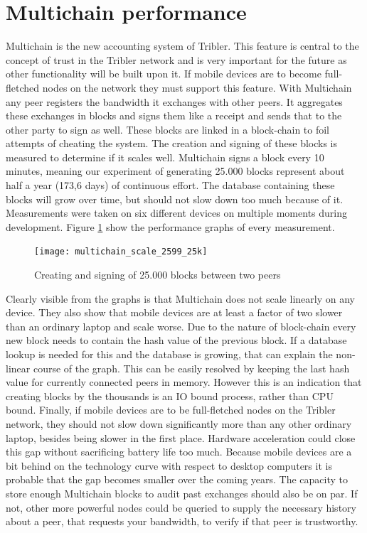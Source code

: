 \section{Multichain performance}
Multichain is the new accounting system of Tribler.
This feature is central to the concept of trust in the Tribler network and is very important for the future as other functionality will be built upon it.
If mobile devices are to become full-fletched nodes on the network they must support this feature.
With Multichain any peer registers the bandwidth it exchanges with other peers.
It aggregates these exchanges in blocks and signs them like a receipt and sends that to the other party to sign as well.
These blocks are linked in a block-chain to foil attempts of cheating the system.
The creation and signing of these blocks is measured to determine if it scales well.
Multichain signs a block every 10 minutes, meaning our experiment of generating 25.000 blocks represent about half a year (173,6 days) of continuous effort.
The database containing these blocks will grow over time, but should not slow down too much because of it.
Measurements were taken on six different devices on multiple moments during development.
Figure \ref{fig:multichain_25} show the performance graphs of every measurement.
\begin{figure}
	\centering
	\texttt{[image: multichain\_scale\_2599\_25k]}
	\caption{Creating and signing of 25.000 blocks between two peers}
	\label{fig:multichain_25}
\end{figure}
Clearly visible from the graphs is that Multichain does not scale linearly on any device.
They also show that mobile devices are at least a factor of two slower than an ordinary laptop and scale worse.
Due to the nature of block-chain every new block needs to contain the hash value of the previous block.
If a database lookup is needed for this and the database is growing, that can explain the non-linear course of the graph.
This can be easily resolved by keeping the last hash value for currently connected peers in memory.
However this is an indication that creating blocks by the thousands is an IO bound process, rather than CPU bound.
Finally, if mobile devices are to be full-fletched nodes on the Tribler network, they should not slow down significantly more than any other ordinary laptop, besides being slower in the first place.
Hardware acceleration could close this gap without sacrificing battery life too much.
Because mobile devices are a bit behind on the technology curve with respect to desktop computers it is probable that the gap becomes smaller over the coming years.
The capacity to store enough Multichain blocks to audit past exchanges should also be on par.
If not, other more powerful nodes could be queried to supply the necessary history about a peer, that requests your bandwidth, to verify if that peer is trustworthy.

